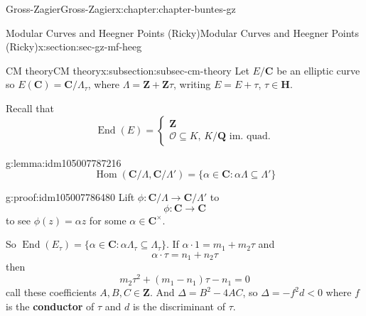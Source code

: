 \documentclass[oneside,10pt,]{book}
\newcommand{\terminology}[1]{\textbf{#1}}
\numberwithin{equation}{section}
\newcommand{\ZZ}{\mathbf{Z}}
\newcommand{\QQ}{\mathbf{Q}}
\newcommand{\CC}{\mathbf{C}}
\newcommand{\HH}{\mathbf{H}}
\newcommand{\ints}{\mathcal{O}}
\DeclareMathOperator{\End}{End}
\DeclareMathOperator{\Hom}{Hom}
\newcommand{\lt}{<}
\begin{document}
\begin{chapterptx}{Gross-Zagier}{}{Gross-Zagier}{}{}{x:chapter:chapter-buntes-gz}
%
%
\typeout{************************************************}
\typeout{************************************************}
%
\begin{sectionptx}{Modular Curves and Heegner Points (Ricky)}{}{Modular Curves and Heegner Points (Ricky)}{}{}{x:section:sec-gz-mf-heeg}
%
%
\typeout{************************************************}
\typeout{************************************************}
%
\begin{subsectionptx}{CM theory}{}{CM theory}{}{}{x:subsection:subsec-cm-theory}
Let \(E/\CC\) be an elliptic curve so \(E(\CC) = \CC/\Lambda_\tau  \), where \(\Lambda  = \ZZ + \ZZ\tau \), writing \(E = E+\tau \), \(\tau  \in \HH\).%
\par
Recall that%
\begin{equation*}
\End(E) = \begin{cases} \ZZ \\ \ints \subseteq K ,\,K/\QQ \text{ im. quad.}\end{cases}
\end{equation*}
%
\begin{lemma}{}{}{g:lemma:idm105007787216}%
%
\begin{equation*}
\Hom(\CC/\Lambda ,\CC/\Lambda')= \{\alpha \in \CC : \alpha  \Lambda  \subseteq \Lambda '\}
\end{equation*}
%
\end{lemma}
\begin{proofptx}{}{g:proof:idm105007786480}
Lift \(\phi  \colon \CC/\Lambda  \to \CC/\Lambda '\) to%
\begin{equation*}
\phi  \colon \CC  \to \CC
\end{equation*}
to see \(\phi (z) = \alpha  z\) for some \(\alpha  \in \CC^\times\).%
\end{proofptx}
So \(\End(E_\tau ) = \{\alpha \in \CC : \alpha  \Lambda _\tau  \subseteq \Lambda _\tau \}\). If \(\alpha  \cdot 1 = m_1 + m_2 \tau \) and%
\begin{equation*}
\alpha \cdot \tau  = n_1 + n_2 \tau 
\end{equation*}
then%
\begin{equation*}
m_2 \tau ^2 + (m_1 - n_1) \tau  - n_1 = 0
\end{equation*}
call these coefficients \(A,B,C \in \ZZ\). And \(\Delta = B^2 - 4AC\), so \(\Delta  = -f^2 d \lt 0\) where \(f\) is the \terminology{conductor} of \(\tau \) and \(d\) is the discriminant of \(\tau \).%
\par

\end{subsectionptx}
\end{sectionptx}
\end{chapterptx}
\end{document}
